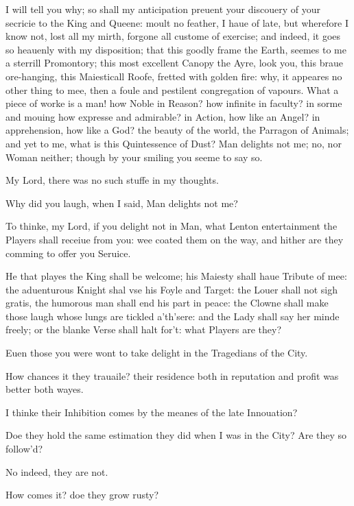 \documentclass[a5paper,DIV=calc,11pt]{scrbook}
\begin{document}
\begin{drama*}
    \hamspeaks I will tell you why; so shall my anticipation preuent your discouery of your secricie to the King and Queene: moult no feather, I haue of late, but wherefore I know not, lost all my mirth, forgone all custome of exercise; and indeed, it goes so heauenly with my disposition; that this goodly frame the Earth, seemes to me a sterrill Promontory; this most excellent Canopy the Ayre, look you, this braue ore-hanging, this Maiesticall Roofe, fretted with golden fire: why, it appeares no other thing to mee, then a foule and pestilent congregation of vapours. What a piece of worke is a man! how Noble in Reason? how infinite in faculty? in sorme and mouing how expresse and admirable? in Action, how like an Angel? in apprehension, how like a God? the beauty of the world, the Parragon of Animals; and yet to me, what is this Quintessence of Dust? Man delights not me; no, nor Woman neither; though by your smiling you seeme to say so.
    
    \rosinspeaks My Lord, there was no such stuffe in my thoughts.
    
    \hamspeaks Why did you laugh, when I said, Man delights not me?
    
    \rosinspeaks To thinke, my Lord, if you delight not in Man, what Lenton entertainment the Players shall receiue from you: wee coated them on the way, and hither are they comming to offer you Seruice.
    
    \hamspeaks He that playes the King shall be welcome; his Maiesty shall haue Tribute of mee: the aduenturous Knight shal vse his Foyle and Target: the Louer shall not sigh gratis, the humorous man shall end his part in peace: the Clowne shall make those laugh whose lungs are tickled a'th'sere: and the Lady shall say her minde freely; or the blanke Verse shall halt for't: what Players are they?
    
    \rosinspeaks Euen those you were wont to take delight in the Tragedians of the City.
    
    \hamspeaks How chances it they trauaile? their residence both in reputation and profit was better both wayes.
    
    \rosinspeaks I thinke their Inhibition comes by the meanes of the late Innouation?
    
    \hamspeaks Doe they hold the same estimation they did when I was in the City? Are they so follow'd?
    
    \rosinspeaks No indeed, they are not.
    
    \hamspeaks How comes it? doe they grow rusty?
    

\end{drama*}
\end{document}
